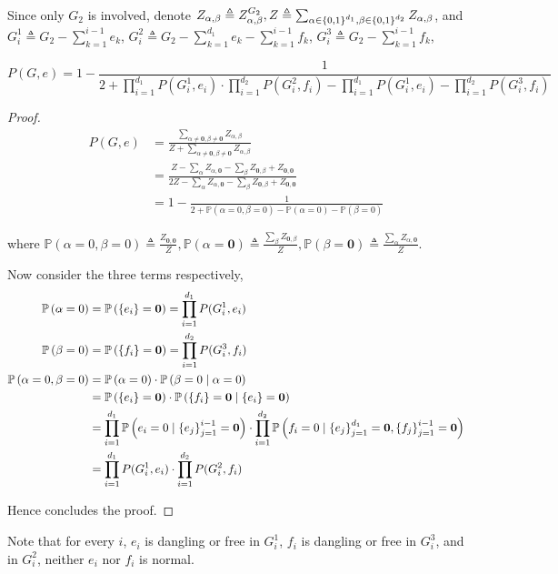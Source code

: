 Since only $G_2$ is involved, denote $Z_{\alpha, \beta} \triangleq Z_{\alpha, \beta}^{G_2}, Z \triangleq \sum_{\alpha \in \left\{0,1\right\}^{d_1} , \beta \in \left\{0,1\right\}^{d_2}} Z_{\alpha, \beta}$,
and
$G_i^1 \triangleq G_2 - \sum_{k=1}^{i-1} e_k$,
$G_i^2 \triangleq G_2 - \sum_{k=1}^{d_1}e_k - \sum_{k=1}^{i-1} f_k$,
$G_i^3 \triangleq G_2 - \sum_{k=1}^{i-1} f_k$,


\begin{Lem}
	
	\[P(G,e) =  1 - \frac{1}{2 + \prod_{i=1}^{d_1} P(G_i^1, e_i) \cdot \prod_{i=1}^{d_2} P(G_i^2, f_i) - \prod_{i=1}^{d_1} P(G_i^1, e_i) - \prod_{i=1}^{d_2} P(G_i^3, f_i)}\]

\end{Lem}
\begin{proof}

	\begin{align*}
P(G,e) &= \frac{\sum_{\alpha \neq \mathbf{0}, \beta \neq \mathbf{0}} Z_{\alpha, \beta}}{Z + \sum_{\alpha \neq \mathbf{0}, \beta \neq \mathbf{0}} Z_{\alpha, \beta}} \\
&=\frac{Z - \sum_{\alpha}Z_{\alpha,\mathbf{0}} - \sum_{\beta} Z_{\mathbf{0}, \beta} + Z_{\mathbf{0}, \mathbf{0}}}{2Z - \sum_{\alpha}Z_{\alpha,\mathbf{0}} - \sum_{\beta} Z_{\mathbf{0}, \beta} + Z_{\mathbf{0}, \mathbf{0}}} \\
&= 1 - \frac{1}{2 + \mathbb{P}\left( \alpha = 0, \beta = 0 \right) - \mathbb{P} \left( \alpha = 0 \right) - \mathbb{P} \left( \beta = 0 \right)}
	\end{align*}

where $\mathbb{P} \left( \alpha = 0, \beta = 0 \right) \triangleq \frac{Z_{\mathbf{0},\mathbf{0}}}{Z}, \mathbb{P} \left( \alpha = \mathbf{0} \right) \triangleq \frac{\sum_{\beta} Z_{\mathbf{0}, \beta} }{Z}, \mathbb{P} \left( \beta = \mathbf{0} \right) \triangleq \frac{\sum_{\alpha} Z_{ \alpha , \mathbf{0}} }{Z}$.

Now consider the three terms respectively,
	\begin{align*}
		\mathbb{P}\left( \alpha = 0\right) &= \mathbb{P} \left( \left\{e_i\right\} = \mathbf{0}\right) =	\prod_{i=1}^{d_1} P(G_i^1, e_i) \\
		\mathbb{P}\left( \beta = 0\right) &= \mathbb{P} \left( \left\{f_i\right\} = \mathbf{0}\right) =	\prod_{i=1}^{d_2} P(G_i^3, f_i) \\
		\mathbb{P}\left( \alpha = 0, \beta = 0 \right) &=  \mathbb{P} \left( \alpha = 0 \right) \cdot \mathbb{P}\left( \beta = 0 \mid \alpha = 0 \right) \\
		&=  \mathbb{P} \left( \left\{e_i\right\} = \mathbf{0}\right) \cdot \mathbb{P} \left( \left\{f_i\right\} = \mathbf{0} \mid \left\{e_i\right\} = \mathbf{0} \right) \\
		&= \prod_{i=1}^{d_1} \mathbb{P} \left( e_i = 0 \mid \left\{e_j\right\}_{j=1}^{i-1} = \mathbf{0} \right) \cdot \prod_{i=1}^{d_2} \mathbb{P} \left( f_i = 0 \mid \left\{e_j\right\}_{j=1}^{d_1} = \mathbf{0},\left\{f_j\right\}_{j=1}^{i-1} = \mathbf{0} \right) \\
		&= \prod_{i=1}^{d_1} P(G_i^1, e_i) \cdot \prod_{i=1}^{d_2} P(G_i^2, f_i)
	\end{align*}

	Hence concludes the proof.
\end{proof}

Note that for every $i$, $e_i$ is dangling or free in $G_i^1$, $f_i$ is dangling or free in $G_i^3$, and in $G_i^2$, neither $e_i$ nor $f_i$ is normal.

